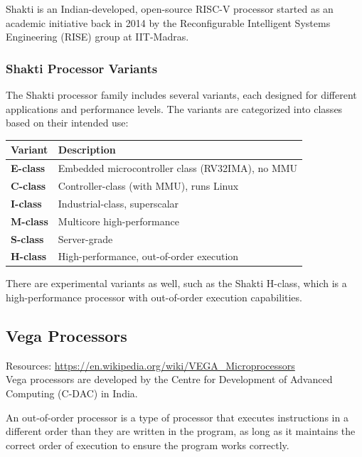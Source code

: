 \documentclass[12pt, a4paper]{article}
\begin{document}
Shakti is an Indian-developed, open-source RISC-V processor started as an academic initiative back in 2014 by the Reconfigurable Intelligent Systems Engineering (RISE) group at IIT-Madras. 

\subsubsection{Shakti Processor Variants}
The Shakti processor family includes several variants, each designed for different applications and performance levels. The variants are categorized into classes based on their intended use:
\begin{center}
\begin{tabular}{|l|p{}|}
\hline
\textbf{Variant} & \textbf{Description} \\
\hline
\textbf{E-class} & Embedded microcontroller class (RV32IMA), no MMU \\
\hline
\textbf{C-class} & Controller-class (with MMU), runs Linux \\
\hline
\textbf{I-class} & Industrial-class, superscalar \\
\hline
\textbf{M-class} & Multicore high-performance \\
\hline
\textbf{S-class} & Server-grade \\
\hline
\textbf{H-class} & High-performance, out-of-order execution \\
\hline
\end{tabular}
\end{center}

There are experimental variants as well, such as the Shakti H-class, which is a high-performance processor with out-of-order execution capabilities.


\subsection{Vega Processors}
Resources: \url{https://en.wikipedia.org/wiki/VEGA_Microprocessors} \\

Vega processors are developed by the Centre for Development of Advanced Computing (C-DAC) in India.

An out-of-order processor is a type of processor that executes instructions in a different order than they are written in the program, as long as it maintains the correct order of execution to ensure the program works correctly.
\end{document}

